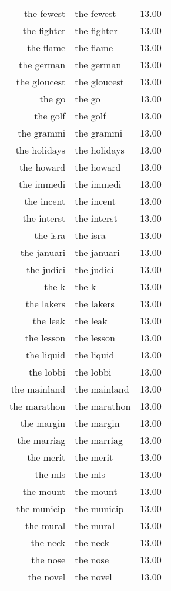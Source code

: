 \begin{table}[ht]
\begin{tabular}{rlr}
  the fewest & the fewest & 13.00 \\ 
  the fighter & the fighter & 13.00 \\ 
  the flame & the flame & 13.00 \\ 
  the german & the german & 13.00 \\ 
  the gloucest & the gloucest & 13.00 \\ 
  the go & the go & 13.00 \\ 
  the golf & the golf & 13.00 \\ 
  the grammi & the grammi & 13.00 \\ 
  the holidays & the holidays & 13.00 \\ 
  the howard & the howard & 13.00 \\ 
  the immedi & the immedi & 13.00 \\ 
  the incent & the incent & 13.00 \\ 
  the interst & the interst & 13.00 \\ 
  the isra & the isra & 13.00 \\ 
  the januari & the januari & 13.00 \\ 
  the judici & the judici & 13.00 \\ 
  the k & the k & 13.00 \\ 
  the lakers & the lakers & 13.00 \\ 
  the leak & the leak & 13.00 \\ 
  the lesson & the lesson & 13.00 \\ 
  the liquid & the liquid & 13.00 \\ 
  the lobbi & the lobbi & 13.00 \\ 
  the mainland & the mainland & 13.00 \\ 
  the marathon & the marathon & 13.00 \\ 
  the margin & the margin & 13.00 \\ 
  the marriag & the marriag & 13.00 \\ 
  the merit & the merit & 13.00 \\ 
  the mls & the mls & 13.00 \\ 
  the mount & the mount & 13.00 \\ 
  the municip & the municip & 13.00 \\ 
  the mural & the mural & 13.00 \\ 
  the neck & the neck & 13.00 \\ 
  the nose & the nose & 13.00 \\ 
  the novel & the novel & 13.00 \\ 

\end{tabular}
\end{table}
